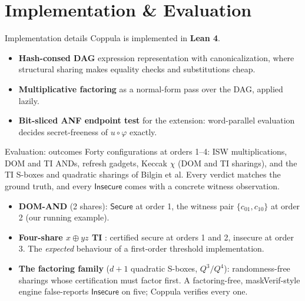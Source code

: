\documentclass[aspectratio=169,10pt]{beamer}
\newcommand{\toolname}{Coppula}
\newcommand{\Secure}{\textsf{Secure}}
\newcommand{\Insecure}{\textsf{Insecure}}
\begin{document}
\section{Implementation \& Evaluation}

\begin{frame}{Implementation details}
  \toolname{} is implemented in \textbf{Lean 4}.
  \medskip
  \begin{itemize}
    \item \textbf{Hash-consed DAG} expression representation with
      canonicalization, where structural sharing makes equality checks and
      substitutions cheap.
    \item \textbf{Multiplicative factoring} as a normal-form pass over the
      DAG, applied lazily.
    \item \textbf{Bit-sliced ANF endpoint test} for the extension:
      word-parallel evaluation decides secret-freeness of $u \circ \varphi$
      exactly.
  \end{itemize}
  \medskip
\end{frame}

  \begin{frame}{Evaluation: outcomes}
  \small
  Forty configurations at orders 1--4: ISW multiplications, DOM and TI ANDs,
  refresh gadgets, Keccak $\chi$ (DOM and TI sharings), and the TI S-boxes and
  quadratic sharings of Bilgin et al. Every verdict matches the ground truth,
  and every $\Insecure$ comes with a concrete witness observation.
  \medskip
  \begin{itemize}
    \item<1-> \textbf{DOM-AND} (2 shares): $\Secure$ at order 1, the witness
      pair $\{c_{01}, c_{10}\}$ at order 2 (our running example).
    \item<1-> \textbf{Four-share $x \oplus yz$ TI} \parencite{bilgin2015threshold}:
      certified secure at orders 1 and 2, insecure at order 3. The
      \emph{expected} behaviour of a first-order threshold implementation.
    \item<2-> \textbf{The factoring family} ($d{+}1$ quadratic S-boxes,
      $Q^3\!/Q^4$): randomness-free sharings whose certification must factor
      first. A factoring-free, maskVerif-style engine false-reports
      $\Insecure$ on five; \toolname{} verifies every one.
  \end{itemize}
  \medskip
\end{frame}
\end{document}
